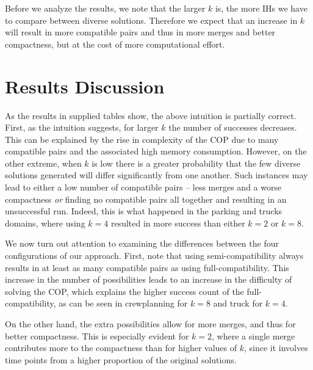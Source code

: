 

Before we analyze the results, we note that the larger $k$ is, the more IHs we have to compare between diverse solutions.
Therefore we expect that an increase in $k$ will result in more compatible pairs and thus in more merges and better compactness, but at the cost of more computational effort. 

\section{Results Discussion}
As the results in supplied tables show, the above intuition is partially correct. 
First, as the intuition suggests, for larger $k$ the number of successes decreases. This can be explained by the rise in complexity of the COP due to many compatible pairs and the associated high memory consumption.
However, on the other extreme, when $k$ is low there is a greater probability that the few diverse solutions generated will differ significantly from one another. Such instances may lead to either a low number of compatible pairs -- less merges and a worse compactness {\em or} finding no compatible pairs all together and resulting in an unsuccessful run. Indeed, this is what happened in the parking and trucks domains, where using $k=4$ resulted in more success than either $k=2$ or $k=8$.


We now turn out attention to examining the differences between the four configurations of our approach. First, note that using semi-compatibility always results in at least as many compatible pairs as using full-compatibility. 
This increase in the number of possibilities leads to an increase in the difficulty of solving the COP, which explains the higher success count of the full-compatibility, as can be seen in crewplanning for $k=8$ and truck for $k=4$.

On the other hand, the extra possibilities allow for more merges, and thus for better compactness. This is especially evident for $k=2$, where a single merge contributes more to the compactness than for higher values of $k$, since it involves time points from a higher proportion of the original solutions. 


